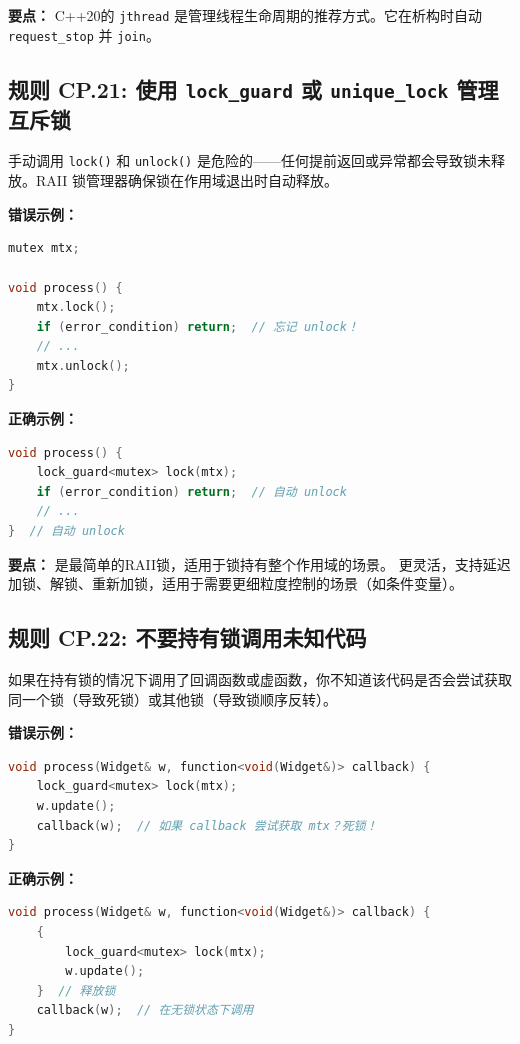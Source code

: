 \textbf{要点：} C++20的 \texttt{jthread} 是管理线程生命周期的推荐方式。它在析构时自动 \texttt{request\_stop} 并 \texttt{join}。

\subsection*{\textbf{规则 CP.21:} 使用 \texttt{lock\_guard} 或 \texttt{unique\_lock} 管理互斥锁}

手动调用 \texttt{lock()} 和 \texttt{unlock()} 是危险的——任何提前返回或异常都会导致锁未释放。RAII 锁管理器确保锁在作用域退出时自动释放。

\textbf{错误示例：}

\begin{lstlisting}[language=C++]
mutex mtx;

void process() {
    mtx.lock();
    if (error_condition) return;  // 忘记 unlock！
    // ...
    mtx.unlock();
}
\end{lstlisting}

\textbf{正确示例：}

\begin{lstlisting}[language=C++]
void process() {
    lock_guard<mutex> lock(mtx);
    if (error_condition) return;  // 自动 unlock
    // ...
}  // 自动 unlock
\end{lstlisting}

\textbf{要点：} \texttt{} 是最简单的RAII锁，适用于锁持有整个作用域的场景。\texttt{} 更灵活，支持延迟加锁、解锁、重新加锁，适用于需要更细粒度控制的场景（如条件变量）。

\subsection*{\textbf{规则 CP.22:} 不要持有锁调用未知代码}

如果在持有锁的情况下调用了回调函数或虚函数，你不知道该代码是否会尝试获取同一个锁（导致死锁）或其他锁（导致锁顺序反转）。

\textbf{错误示例：}

\begin{lstlisting}[language=C++]
void process(Widget& w, function<void(Widget&)> callback) {
    lock_guard<mutex> lock(mtx);
    w.update();
    callback(w);  // 如果 callback 尝试获取 mtx？死锁！
}
\end{lstlisting}

\textbf{正确示例：}

\begin{lstlisting}[language=C++]
void process(Widget& w, function<void(Widget&)> callback) {
    {
        lock_guard<mutex> lock(mtx);
        w.update();
    }  // 释放锁
    callback(w);  // 在无锁状态下调用
}
\end{lstlisting}

